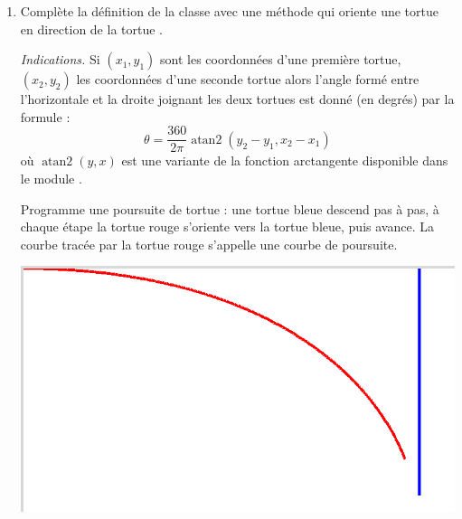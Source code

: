 \documentclass[11pt,class=report,crop=false]{standalone}
\begin{document}
\begin{activite}
\begin{enumerate}
 
    
  \item Complète la définition de la classe avec une méthode 
  qui oriente une tortue  en direction de la tortue .
  
  
  \emph{Indications.} Si $(x_1,y_1)$ sont les coordonnées d'une première tortue, $(x_2,y_2)$ les coordonnées d'une seconde tortue alors l'angle formé entre l'horizontale et la droite joignant les deux tortues est donné (en degrés) par la formule :
  $$\theta = \frac{360}{2\pi} \operatorname{atan2}(y_2-y_1,x_2-x_1)$$
  où $\operatorname{atan2}(y,x)$ est une variante de la fonction arctangente disponible dans le module .
  
  Programme une poursuite de tortue : une tortue bleue descend pas à pas, à chaque étape la tortue rouge s'oriente vers la tortue bleue, puis avance. La courbe tracée par la tortue rouge s'appelle une \og{}courbe de poursuite\fg{}.
  
\begin{center}
\includegraphics[scale=\myscale,scale=0.4]{ecran-tortue-3}
\end{center}	 
  
\end{enumerate} 

\end{activite}
\end{document}
